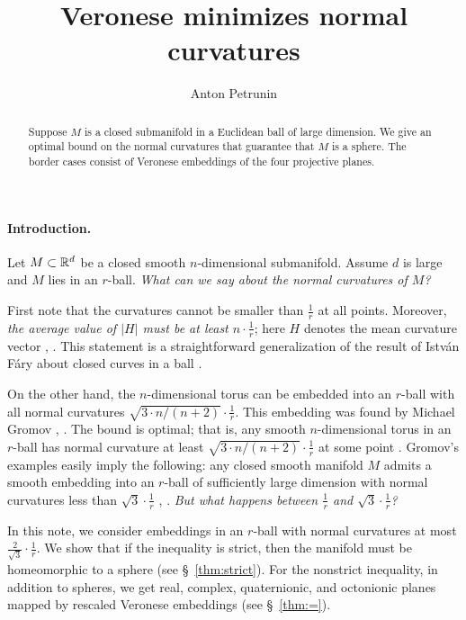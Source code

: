 \documentclass[a4paper,10pt]{article}
\def\thetitle{Veronese minimizes normal curvatures}
\def\theauthors{Anton Petrunin}
\begin{document}


\title{\thetitle}
\author{\theauthors}
\date{}
\maketitle

\begin{abstract}
Suppose $M$ is a closed submanifold in a Euclidean ball of large dimension.
We give an optimal bound on the normal curvatures that guarantee that $M$ is a sphere.
The border cases consist of Veronese embeddings of the four projective planes.
\end{abstract}

\paragraph{Introduction.} Let $M\subset \mathbb{R}^d$ be a closed smooth $n$-dimensional submanifold.
Assume $d$ is large and $M$ lies in an $r$-ball.
\textit{What can we say about the normal curvatures of $M$?}

First note that the curvatures cannot be smaller than $\tfrac1r$ at all points.
Moreover, 
\textit{the average value of $|H|$ must be at least $n\cdot\tfrac1r$};
here $H$ denotes the mean curvature vector \cite[28.2.5]{burago-zalgaller}, \cite[3.1]{petrunin2024a}.
This statement is a straightforward generalization of the result of István Fáry about closed curves in a ball \cite{fary,tabachnikov}.

On the other hand, the $n$-dimensional torus can be embedded into an $r$-ball with all normal curvatures $\sqrt{3\cdot n/(n+2)}\cdot\tfrac1r$.
This embedding was found by Michael Gromov
\cite[2.A]{gromov3}, \cite[1.1.A]{gromov2}.
The bound is optimal; that is, any smooth $n$-dimensional torus in an $r$-ball has normal curvature at least $\sqrt{3\cdot n/(n+2)}\cdot\tfrac1r$ at some point
\cite{petrunin2024a}.
Gromov's examples easily imply the following:
any closed smooth manifold $M$ admits a smooth embedding into an $r$-ball of sufficiently large dimension with normal curvatures less than $\sqrt{3}\cdot\tfrac1r$
\cite[1.D]{gromov3}, \cite[1.1.C]{gromov2}.
\textit{But what happens between $\tfrac1r$ and  $\sqrt{3}\cdot\tfrac1r$?}

In this note, we consider embeddings in an $r$-ball with normal curvatures at most $\tfrac2{\sqrt{3}}\cdot \tfrac1r$.
We show that if the inequality is strict, then the manifold must be homeomorphic to a sphere (see §~\ref{thm:strict}).
For the nonstrict inequality, in addition to spheres, we get real, complex, quaternionic, and octonionic planes mapped by rescaled Veronese embeddings (see §~\ref{thm:=}).
\end{document}
